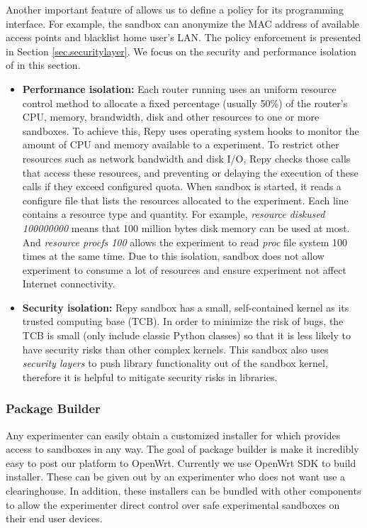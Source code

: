 Another important feature of \sandboxname allows us to define a policy for its programming interface. For example, the sandbox can anonymize the MAC address of available access points and blacklist home user's LAN. The policy enforcement is presented in Section \ref{sec.securitylayer}. We focus on the security and performance isolation of \sandboxname in this section.
\begin{itemize}
\item \textbf{Performance isolation: }Each router running \sysname uses an uniform resource control method to allocate a fixed percentage (usually 50\%) of the router's CPU, memory, brandwidth, disk and other resources to one or more sandboxes. To achieve this, Repy uses operating system hooks to monitor the amount of CPU and memory available to a experiment. To restrict other resources such as network bandwidth and disk I/O, Repy checks those calls that access these resources, and preventing or delaying the execution of these calls if they exceed configured quota. When sandbox is started, it reads a configure file that lists the resources allocated to the experiment. Each line contains a resource type and quantity. For example, \textit{resource diskused 100000000} means that 100 million bytes disk memory can be used at most. And \textit{resource procfs 100} allows the experiment to read \textit{proc} file system 100 times at the same time. Due to this isolation, sandbox does not allow experiment to consume a lot of resources and ensure experiment not affect Internet connectivity.

\item \textbf{Security isolation: }Repy sandbox has a small, self-contained kernel as its trusted computing base (TCB). In order to minimize the risk of bugs, the TCB is small (only include classic Python classes) so that it is less likely to have security risks than other complex kernels. This sandbox also uses \textit{security layers} to push library functionality out of the sandbox kernel, therefore it is helpful to mitigate security risks in libraries. 

\end{itemize}
\subsubsection{Package Builder}
\label{sec.packagebuilder}
Any experimenter can easily obtain a customized installer for \sysname which provides access to sandboxes in any way. The goal of package builder is make it incredibly easy to post our platform to OpenWrt. Currently we use OpenWrt SDK to build installer. These can be given out by an experimenter who does not want use a clearinghouse. In addition, these installers can be bundled with other components to allow the experimenter direct control over safe experimental sandboxes on their end user devices.

